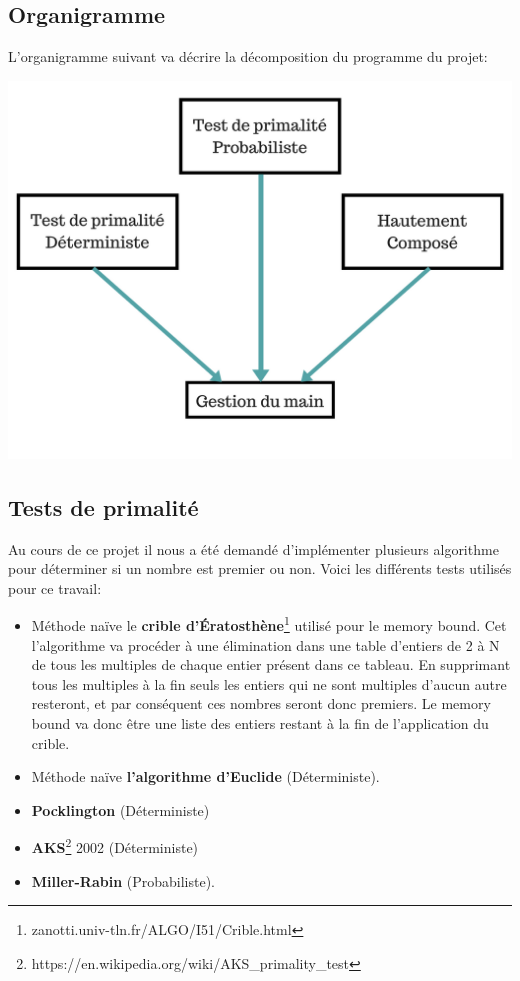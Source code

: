 		\subsection{Organigramme}
		L'organigramme suivant va décrire la décomposition du programme du projet:\\ 
		\begin{center}\includegraphics[scale=0.5]{organigramme.png}\end{center}
		
		\subsection{Tests de primalité}
		Au cours de ce projet il nous a été demandé d'implémenter plusieurs algorithme pour déterminer si un nombre est premier ou non. Voici les différents tests utilisés pour ce travail:
		\begin{itemize}
			\item Méthode naïve le \textbf{crible d’Ératosthène}\footnote{zanotti.univ-tln.fr/ALGO/I51/Crible.html} utilisé pour le memory bound. Cet l'algorithme va procéder à une élimination dans une table d'entiers de 2 à N de tous les multiples de chaque entier présent dans ce tableau. En supprimant tous les multiples à la fin seuls les entiers qui ne sont multiples d'aucun autre resteront, et par conséquent ces nombres seront donc premiers. Le memory bound va donc être une liste des entiers restant à la fin de l'application du crible.\\
			\item Méthode naïve \textbf{l'algorithme d'Euclide} (Déterministe).
			\item \textbf{Pocklington} (Déterministe)
			\item \textbf{AKS}\footnote{https://en.wikipedia.org/wiki/AKS\_primality\_test} 2002 (Déterministe)
			\item \textbf{Miller-Rabin} (Probabiliste).
		\end{itemize}
		
